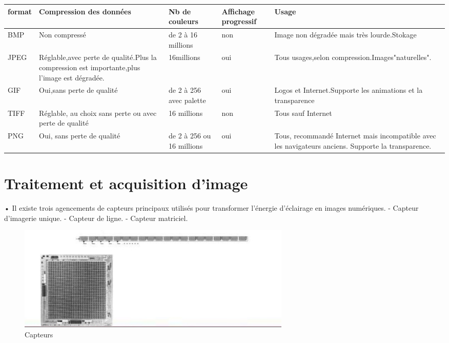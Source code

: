 \documentclass[12pt,a4paper]{report}
\numberwithin{equation}{subsection}
\numberwithin{equation}{section}
\begin{document}
\begin{tabular}{|p{1.5cm}|p{4cm}|p{2cm}|p{2cm}|p{4cm}|}
\hline
format & Compression des
données & Nb de
couleurs & Affichage
progressif & Usage \\
\hline
BMP & Non compressé & de 2 à 16
millions & non & Image non dégradée mais très lourde.Stokage \\
\hline
JPEG & Réglable,avec perte de qualité.Plus la compression est importante,plus l'image est dégradée. & 16millions & oui & Tous usages,selon compression.Images"naturelles".\\
\hline
GIF & Oui,sans perte de qualité & de 2 à 256 avec palette & oui & Logos et Internet.Supporte les animations et la transparence \\
\hline
TIFF & Réglable, au choix sans perte ou avec perte de qualité & 16 millions & non & Tous sauf Internet \\
\hline
PNG & Oui, sans perte de qualité & de 2 à 256 ou 16 millions & oui & Tous, recommandé Internet mais incompatible avec les navigateurs anciens. Supporte la transparence. \\
\hline
\end{tabular}


\newpage
\section{ Traitement et acquisition d'image}
• Il existe trois agencements de capteurs principaux utilisés pour transformer l'énergie d'éclairage en images numériques.  \newline- Capteur d'imagerie unique. \newline- Capteur de ligne. \newline- Capteur matriciel.
\begin{figure}[!h]
    \centering
    \begin{center}
        \includegraphics[height=5cm,width=10cm\textwidth]{capteur1.png}
    \end{center}
    \caption{Capteurs}
\end{figure}
\end{document}
